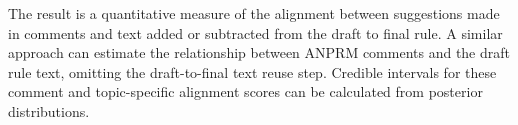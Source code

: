 The result is a quantitative measure of the alignment between suggestions made in comments and text added or subtracted from the draft to final rule. A similar approach can estimate the relationship between ANPRM comments and the draft rule text, omitting the draft-to-final text reuse step. Credible intervals for these comment and topic-specific alignment scores can be calculated from posterior distributions. 



